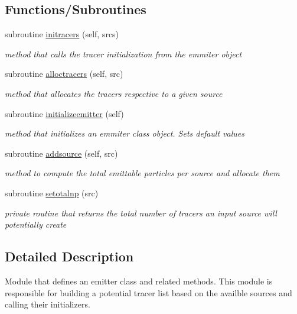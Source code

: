 \subsection*{Functions/\+Subroutines}
\begin{DoxyCompactItemize}
\item 
subroutine \hyperlink{namespaceemitter__mod_ad89dfc083eae7362441c353225a74ebc}{initracers} (self, srcs)
\begin{DoxyCompactList}\small\item\em method that calls the tracer initialization from the emmiter object \end{DoxyCompactList}\item 
subroutine \hyperlink{namespaceemitter__mod_a7c677125988390e4c57909e4ea82d902}{alloctracers} (self, src)
\begin{DoxyCompactList}\small\item\em method that allocates the tracers respective to a given source \end{DoxyCompactList}\item 
subroutine \hyperlink{namespaceemitter__mod_a6376ad0f8e1739b29caf672aa0750373}{initializeemitter} (self)
\begin{DoxyCompactList}\small\item\em method that initializes an emmiter class object. Sets default values \end{DoxyCompactList}\item 
subroutine \hyperlink{namespaceemitter__mod_ab704fb0e2eb9b3b4b9542706b6fb4eaf}{addsource} (self, src)
\begin{DoxyCompactList}\small\item\em method to compute the total emittable particles per source and allocate them \end{DoxyCompactList}\item 
subroutine \hyperlink{namespaceemitter__mod_a5c219dd6692a761ad4bf968ae750fcc6}{setotalnp} (src)
\begin{DoxyCompactList}\small\item\em private routine that returns the total number of tracers an input source will potentially create \end{DoxyCompactList}\end{DoxyCompactItemize}


\subsection{Detailed Description}
Module that defines an emitter class and related methods. This module is responsible for building a potential tracer list based on the availble sources and calling their initializers. 

